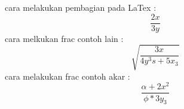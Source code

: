 \documentclass[12pt]{article}
\begin{document}
	cara melakukan pembagian pada LaTex : $$\frac{2x}{3y}$$
	cara melkukan frac contoh lain : $$\sqrt{\frac{3x}{4y^3s+5x_3}}$$
	cara melakukan frac contoh akar : $$\frac{\alpha + 2x^2}{\phi * 3y_3}$$
\end{document}
